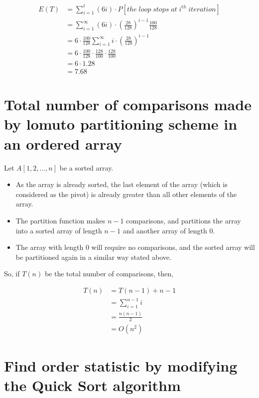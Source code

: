 \documentclass{article}
\begin{document}
\begin{align*}
    E(T) &= \sum_{i=1}^t (6i)\cdot P[the \;loop \;stops \;at \;i^{th} \;iteration]\\
    &=\sum_{i=1}^\infty (6i)\cdot\left(\frac{28}{128}\right)^{i-1} \frac{100}{128}\\
    &=6\cdot\frac{100}{128}\sum_{i=1}^\infty i\cdot\left(\frac{28}{128}\right)^{i-1} \\
    &=6\cdot\frac{100}{128}\cdot\frac{128}{100}\cdot\frac{128}{100}\\
    &=6\cdot1.28\\
    &=7.68
\end{align*}

\section{Total number of comparisons made by lomuto partitioning scheme in an ordered array}

Let $A[1, 2, \dots, n] $ be a sorted array.
\begin{itemize}
   
\item As the array is already sorted, the last element of the array (which is considered as the pivot) is already greater than all other elements of the array. 
\item The partition function makes $n-1$ comparisons, and partitions the array into a sorted array of length $n-1$ and another array of length $0$.
\item The array with length $0$ will require no comparisons, and the sorted array will be partitioned again in a similar way stated above.
\end{itemize}

So, if $T(n)$ be the total number of comparisons, then,

\begin{align*}
T(n) &= T(n-1) + n-1 \\
     &= \sum_{i=1}^{n-1} i \\
     &= \frac{n(n-1)}{2} \\
     &= O(n^2)
\end{align*}


\section{Find order statistic by modifying the Quick Sort algorithm}
\end{document}
